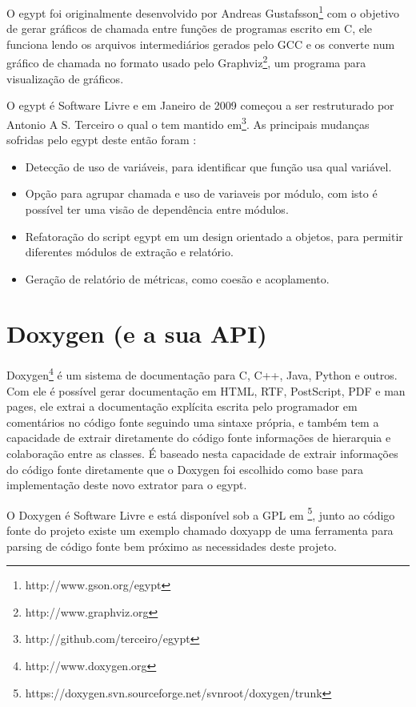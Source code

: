 O egypt foi originalmente desenvolvido por Andreas Gustafsson\footnote{http://www.gson.org/egypt} com o objetivo de gerar gráficos de chamada entre funções de programas escrito em C, ele funciona lendo os arquivos intermediários gerados pelo GCC e os converte num gráfico de chamada no formato usado pelo Graphviz\footnote{http://www.graphviz.org}, um programa para visualização de gráficos.

O egypt é Software Livre e em Janeiro de 2009 começou a ser restruturado por Antonio A S. Terceiro o qual o tem mantido em\footnote{http://github.com/terceiro/egypt}. As principais mudanças sofridas pelo egypt deste então foram \cite{StructuralComplexityEvolution}:

\begin{itemize}
\item Detecção de uso de variáveis, para identificar que função usa qual variável.
\item Opção para agrupar chamada e uso de variaveis por módulo, com isto é possível ter uma visão de dependência entre módulos.
\item Refatoração do script egypt em um design orientado a objetos, para permitir diferentes módulos de extração e relatório.
\item Geração de relatório de métricas, como coesão e acoplamento.
\end{itemize}

\section{Doxygen (e a sua API)}

Doxygen\footnote{http://www.doxygen.org} é um sistema de documentação para C, C++, Java, Python e outros. Com ele é possível gerar documentação em HTML, RTF, PostScript, PDF e man pages, ele extrai a documentação explícita escrita pelo programador em comentários no código fonte seguindo uma sintaxe própria, e também tem a capacidade de extrair diretamente do código fonte informações de hierarquia e colaboração entre as classes. É baseado nesta capacidade de extrair informações do código fonte diretamente que o Doxygen foi escolhido como base para implementação deste novo extrator para o egypt.

O Doxygen é Software Livre e está disponível sob a GPL  em \footnote{https://doxygen.svn.sourceforge.net/svnroot/doxygen/trunk}, junto ao código fonte do projeto existe um exemplo chamado doxyapp de uma ferramenta para parsing de código fonte bem próximo as necessidades deste projeto.

